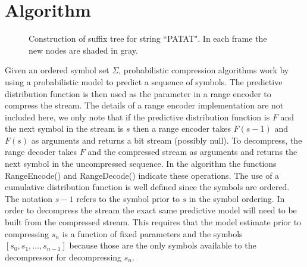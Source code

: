 \section{Algorithm}

\newcommand{\T}{\ensuremath{\mathcal{T}}}
\newcommand{\N}{\ensuremath{\mathcal{N}}}
\newcommand{\M}{\ensuremath{\mathcal{M}}}
\newcommand{\PP}{\ensuremath{\mathcal{P}}}
\newcommand{\nc}{\ensuremath{nc}}
\newcommand{\RS}{\ensuremath{\mathcal{R}\mathcal{S}}}
\newcommand{\D}{\ensuremath{\mathcal{D}}}
\newcommand{\la}{\ensuremath{\leftarrow}}
\newcommand{\G}{\ensuremath{\mathcal{G}}}
\newcommand{\IS}{\ensuremath{\mathcal{I}\mathcal{S}}}
\newcommand{\Seq}{\ensuremath{\mathcal{S}}}
\newcommand{\dd}{\ensuremath{\delta}}

\begin{figure}[t] 
	\begin{center}
		\caption{Construction of suffix tree for string ``PATAT".  In each frame the new nodes are shaded in gray.}
		\label{fig:suffix_tree}
	\end{center} 
\end{figure} 

Given an ordered symbol set $\Sigma$, probabilistic compression algorithms work by using a probabilistic model to predict a sequence of symbols.   The predictive distribution function is then used as the parameter in a range encoder to compress the stream. The details of a range encoder implementation are not included here, we only note that if the predictive distribution function is $F$ and the next symbol in the stream is $s$ then a range encoder takes $F(s-1)$ and $F(s)$ as arguments and returns a bit stream (possibly null). To decompress, the range decoder takes $F$ and the compressed stream as arguments and returns the next symbol in the uncompressed sequence. In the algorithm the functions RangeEncode() and RangeDecode() indicate these operations.  The use of a cumulative distribution function is well defined since the symbols are ordered.  The notation $s-1$ refers to the symbol prior to $s$ in the symbol ordering.  In order to decompress the stream the exact same predictive model will need to be built from the compressed stream.  This requires that the model estimate prior to compressing $s_n$ is a function of fixed parameters and the symbols $[s_0, s_1, \ldots, s_{n-1}]$ because those are the only symbols available to the decompressor for decompressing $s_n$.  


